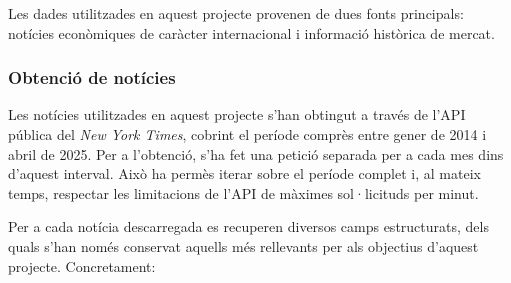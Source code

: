 \documentclass[12pt,a4paper,twoside]{book}
\begin{document}
Les dades utilitzades en aquest projecte provenen de dues fonts principals: notícies econòmiques de caràcter internacional i informació històrica de mercat.

\subsubsection{Obtenció de notícies}

Les notícies utilitzades en aquest projecte s'han obtingut a través de l'API pública del \textit{New York Times}, cobrint el període comprès entre gener de 2014 i abril de 2025. Per  a l'obtenció, s'ha fet una petició separada per a cada mes dins d'aquest interval. Això ha permès iterar sobre el període complet i, al mateix temps, respectar les limitacions de l'API de màximes sol·licituds per minut.

Per a cada notícia descarregada es recuperen diversos camps estructurats, dels quals s'han només conservat aquells més rellevants per als objectius d'aquest projecte. Concretament:
\end{document}
